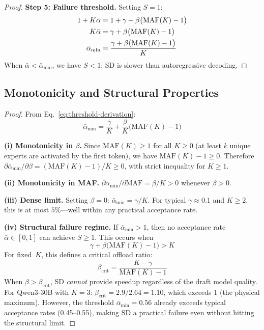 \documentclass[letterpaper,twocolumn,10pt]{article}
\newcommand{\thetabar}{\bar{\alpha}}
\begin{document}
\begin{appendices}
\begin{proof}
\textbf{Step 5: Failure threshold.}
Setting $S = 1$:
\begin{align}
  1+K\thetabar &= 1 + \gamma + \beta\bigl(\text{MAF}(K)-1\bigr) \notag\\
  K\thetabar &= \gamma + \beta\bigl(\text{MAF}(K)-1\bigr) \notag\\
  \thetabar_{\min}
    &= \frac{\gamma + \beta\bigl(\text{MAF}(K)-1\bigr)}{K}
       \label{eq:threshold-derivation}
\end{align}
When $\thetabar < \thetabar_{\min}$, we have $S < 1$: SD is slower than
autoregressive decoding.
\end{proof}

\subsection{Monotonicity and Structural Properties}\label{app:monotone}

\begin{proof}
From Eq.~\eqref{eq:threshold-derivation}:
\[
  \thetabar_{\min} = \frac{\gamma}{K}
                    + \frac{\beta}{K}\bigl(\text{MAF}(K)-1\bigr)
\]

\textbf{(i) Monotonicity in $\beta$.}
Since $\text{MAF}(K) \geq 1$ for all $K \geq 0$ (at least $k$ unique
experts are activated by the first token), we have
$\text{MAF}(K)-1 \geq 0$.  Therefore $\partial\thetabar_{\min}/\partial\beta
= (\text{MAF}(K)-1)/K \geq 0$, with strict inequality for $K \geq 1$.

\textbf{(ii) Monotonicity in MAF.}
$\partial\thetabar_{\min}/\partial\text{MAF} = \beta/K > 0$ whenever
$\beta > 0$.

\textbf{(iii) Dense limit.}
Setting $\beta = 0$: $\thetabar_{\min} = \gamma/K$.  For typical
$\gamma \approx 0.1$ and $K \geq 2$, this is at most $5\%$---well within
any practical acceptance rate.

\textbf{(iv) Structural failure regime.}
If $\thetabar_{\min} > 1$, then no acceptance rate $\thetabar \in [0,1]$
can achieve $S \geq 1$.  This occurs when
\begin{equation}\label{eq:structural-failure}
  \gamma + \beta\bigl(\text{MAF}(K)-1\bigr) > K
\end{equation}
For fixed~$K$, this defines a critical offload ratio:
\begin{equation}\label{eq:beta-crit}
  \beta_{\text{crit}} = \frac{K - \gamma}{\text{MAF}(K)-1}
\end{equation}
When $\beta > \beta_{\text{crit}}$, SD \emph{cannot} provide speedup
regardless of the draft model quality.  For Qwen3-30B with $K\!=\!3$:
$\beta_{\text{crit}} = 2.9/2.64 = 1.10$, which exceeds 1 (the physical
maximum).  However, the threshold $\thetabar_{\min}= 0.56$ already exceeds
typical acceptance rates (0.45--0.55), making SD a practical failure even
without hitting the structural limit.
\end{proof}


\end{appendices}
\end{document}
